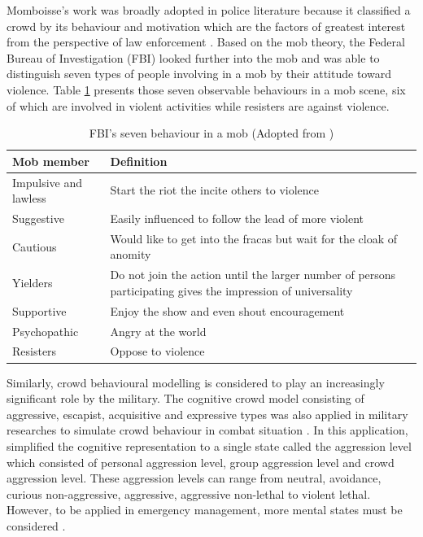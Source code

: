 Momboisse’s work was broadly adopted in police literature because it classified a crowd by its behaviour and motivation which are the factors of greatest interest from the perspective of law enforcement \citep{FBI1967}. Based on the mob theory, the Federal Bureau of Investigation (FBI) looked further into the mob and was able to distinguish seven types of people involving in a mob by their attitude toward violence. Table \ref{table:fbiMobBehavior} presents those seven observable behaviours in a mob scene, six of which are involved in violent activities while resisters are against violence.

\begin{table}
	\caption{FBI's seven behaviour in a mob (Adopted from \citet{FBI1967})}
	\label{table:fbiMobBehavior}
	\centering
	\begin{tabular}{|l|p{10cm}|}
		\hline
		\textbf{Mob member} & \textbf{Definition} \\ \hline \hline
		Impulsive and lawless & Start the riot the incite others to violence \\ \hline
		Suggestive &  Easily influenced to follow the lead of more violent \\ \hline
		Cautious & Would like to get into the fracas but wait for the cloak of anomity \\ \hline
		Yielders & Do not join the action until the larger number of persons participating gives the impression of universality \\ \hline
		Supportive & Enjoy the show and even shout encouragement \\ \hline
		Psychopathic & Angry at the world \\ \hline
		Resisters & Oppose to violence \\ \hline
	\end{tabular}
\end{table}

Similarly, crowd behavioural modelling is considered to play an increasingly significant role by the military. The cognitive crowd model consisting of aggressive, escapist, acquisitive and expressive types was also applied in military researches to simulate crowd behaviour in combat situation \citep{Petty2004}. In this application, \citet{Nguyen2005} simplified the cognitive representation to a single state called the aggression level which consisted of personal aggression level, group aggression level and crowd aggression level. These aggression levels can range from neutral, avoidance, curious non-aggressive, aggressive, aggressive non-lethal to violent lethal. However, to be applied in emergency management, more mental states must be considered \citep{Zhou2010}.

